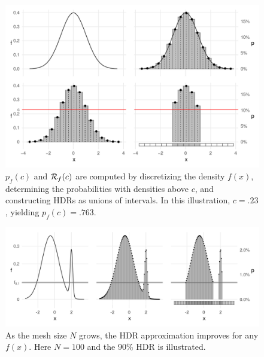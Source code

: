 \begin{knitrout}
\color{fgcolor}\begin{figure}[h!]

{\centering \includegraphics[width=\maxwidth]{figures/hdr-1d-1-1}

}
\caption{$p_{f}(c)$ and $\mathcal{R}_{f}(c)$ are computed by discretizing the density $f(x)$, determining the probabilities with densities above $c$, and constructing HDRs as unions of intervals.
In this illustration, $c = .23$, yielding $p_{f}(c) = .763$.
}\label{fig:hdr-1d-1}
\end{figure}

\end{knitrout}

\newpage


\begin{knitrout}
\color{fgcolor}\begin{figure}[h!]

{\centering \includegraphics[width=\maxwidth]{figures/hdr-1d-2-1}

}

\caption{As the mesh size $N$ grows, the HDR approximation improves for any $f(x)$. Here $N = 100$ and the 90\% HDR is illustrated.}\label{fig:hdr-1d-2}
\end{figure}

\end{knitrout}

